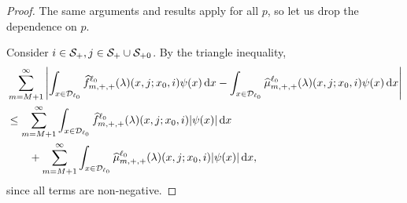 \begin{proof}
	The same arguments and results apply for all \(p\), so let us drop the dependence on \(p\). 
	
	Consider \(i\in\mathcal{S}_+,j\in\mathcal S_+\cup\mathcal{S}_{+0}\). By the triangle inequality, 
	\begin{align*}
		&\sum_{m=M+1}^\infty \left| \int_{x\in\mathcal{D}_{\ell_0}} \widehat f^{\ell_0}_{m,+,+}(\lambda)(x,j;x_0,i)\psi(x) \, \mathrm{d} x
		-
		 \int_{x\in\mathcal{D}_{\ell_0}} \widehat \mu^{\ell_0}_{m,+,+}(\lambda)(x,j;x_0,i) \psi(x) \, \mathrm{d} x \right|
		\\&\leq\sum_{m=M+1}^\infty \int_{x\in\mathcal{D}_{\ell_0}} \widehat f^{\ell_0}_{m,+,+}(\lambda)(x,j;x_0,i) |\psi(x)| \, \mathrm{d} x
		\\&\qquad{} +\sum_{m=M+1}^\infty \int_{x\in\mathcal{D}_{\ell_0}} \widehat  \mu^{\ell_0}_{m,+,+}(\lambda)(x,j;x_0,i) |\psi(x)| \, \mathrm{d} x,
	\end{align*}
	since all terms are non-negative. 
	

\end{proof}
